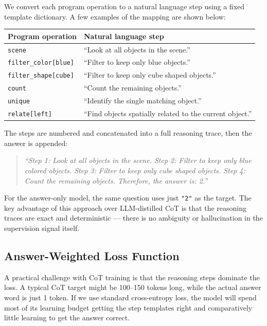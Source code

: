 \documentclass[11pt,twocolumn]{article}
\begin{document}
We convert each program operation to a natural language step using a fixed template dictionary. A few examples of the mapping are shown below:

\begin{center}
\small
\begin{tabular}{lp{}}
\toprule
\textbf{Program operation} & \textbf{Natural language step} \\
\midrule
\texttt{scene} & ``Look at all objects in the scene.'' \\
\texttt{filter\_color[blue]} & ``Filter to keep only blue objects.'' \\
\texttt{filter\_shape[cube]} & ``Filter to keep only cube shaped objects.'' \\
\texttt{count} & ``Count the remaining objects.'' \\
\texttt{unique} & ``Identify the single matching object.'' \\
\texttt{relate[left]} & ``Find objects spatially related to the current object.'' \\
\bottomrule
\end{tabular}
\end{center}

The steps are numbered and concatenated into a full reasoning trace, then the answer is appended:
\begin{quote}
\small\textit{``Step 1: Look at all objects in the scene. Step 2: Filter to keep only blue colored objects. Step 3: Filter to keep only cube shaped objects. Step 4: Count the remaining objects. Therefore, the answer is: 2.''}
\end{quote}

For the answer-only model, the same question uses just \texttt{"2"} as the target. The key advantage of this approach over LLM-distilled CoT is that the reasoning traces are exact and deterministic — there is no ambiguity or hallucination in the supervision signal itself.

\subsection{Answer-Weighted Loss Function}

A practical challenge with CoT training is that the reasoning steps dominate the loss. A typical CoT target might be 100--150 tokens long, while the actual answer word is just 1 token. If we use standard cross-entropy loss, the model will spend most of its learning budget getting the step templates right and comparatively little learning to get the answer correct.
\end{document}
